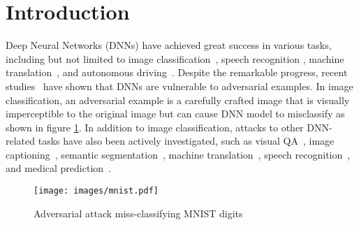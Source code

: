 \documentclass{article}
\begin{document}
\section{Introduction}
Deep Neural Networks (DNNs) have achieved great success in various tasks, including but not limited to image classification~\cite{krizhevsky2012imagenet},  speech recognition \cite{hinton2012deep}, machine translation~\cite{bahdanau2014neural}, and autonomous driving~\cite{chen2015deepdriving}. Despite the remarkable progress, recent studies~\cite{szegedy2013intriguing,goodfellow2014explaining,carlini2017towards} have shown that DNNs are 
vulnerable to adversarial examples. In image classification, an adversarial example is a carefully crafted image that is visually imperceptible to the original image but can cause DNN model to misclassify as shown in figure \ref{mnisti}. In addition to image classification, attacks to other DNN-related tasks have also been actively investigated, such as visual QA~\cite{xu2017can}, image captioning~\cite{chen2017show},  semantic segmentation~\cite{metzen2017universal}, machine translation~\cite{cheng2018seq2sick}, speech recognition~\cite{ carlini2018audio}, and medical prediction~\cite{sun2018identify}.  

\begin{figure}[ht]
  \centering
   \texttt{[image: images/mnist.pdf]}
   \caption{Adversarial attack miss-classifying MNIST digits}
   \label{mnisti}
\end{figure}
\end{document}
